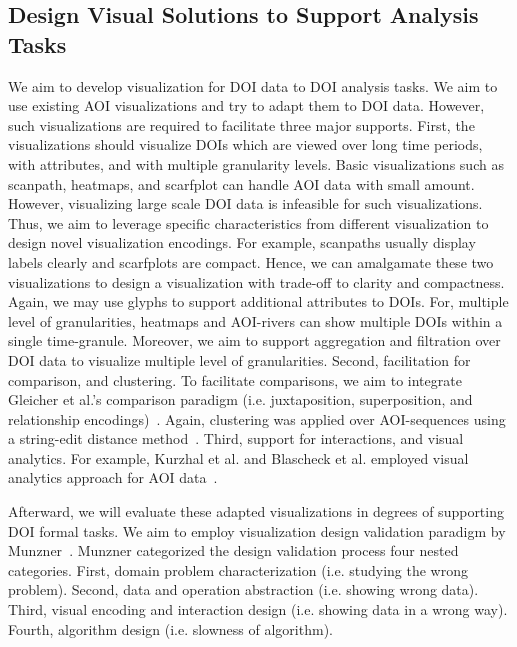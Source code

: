 \subsection{Design Visual Solutions to Support Analysis Tasks}
We aim to develop visualization for DOI data to DOI analysis tasks. We aim to use existing AOI visualizations and try to adapt them to DOI data. However, such visualizations are required to facilitate three major supports. First, the visualizations should visualize DOIs which are viewed over long time periods, with attributes, and with multiple granularity levels. Basic visualizations such as scanpath, heatmaps, and scarfplot can handle AOI data with small amount. However, visualizing large scale DOI data is infeasible for such visualizations. Thus, we aim to leverage specific characteristics from different visualization to design novel visualization encodings. For example, scanpaths usually display labels clearly and scarfplots are compact. Hence, we can amalgamate these two visualizations to design a visualization with trade-off to clarity and compactness. Again, we may use glyphs to support additional attributes to DOIs. For, multiple level of granularities, heatmaps and AOI-rivers can show multiple DOIs within a single time-granule. Moreover, we aim to support aggregation and filtration over DOI data to visualize multiple level of granularities. Second, facilitation for comparison, and clustering. To facilitate comparisons, we aim to integrate Gleicher et al.'s comparison paradigm (i.e. juxtaposition, superposition, and relationship encodings)~\cite{Glei11}. Again, clustering was applied over AOI-sequences using a string-edit distance method~\cite{Kur14}. Third, support for interactions, and visual analytics. For example, Kurzhal et al. and Blascheck et al. employed visual analytics approach for AOI data~\cite{Kur14, Bla16}.

Afterward, we will evaluate these adapted visualizations in degrees of supporting DOI formal tasks. We aim to employ visualization design validation paradigm by Munzner~\cite{Mun09}.  Munzner categorized the design validation process four nested categories. First, domain problem characterization (i.e. studying the wrong problem). Second, data and operation abstraction (i.e. showing wrong data). Third, visual encoding and interaction design (i.e. showing data in a wrong way). Fourth, algorithm design (i.e. slowness of algorithm).     


